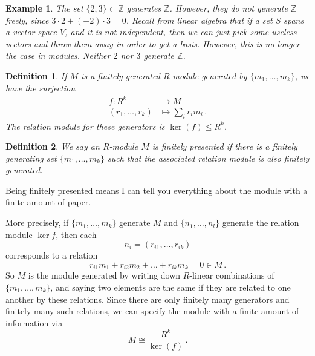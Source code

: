 \documentclass{article}
\theoremstyle{plain}\theoremheaderfont{\normalfont\itshape}\theorembodyfont{\rmfamily}\theoremseparator{.}\newtheorem*{rem}{Remark}\newtheorem*{ex}{Example}\newtheorem*{proof}{Proof}\newtheorem*{altp}{Alternative proof}\newtheorem*{nonex}{Non-Example}
\theoremstyle{plain}\theoremheaderfont{\normalfont\bfseries}\theorembodyfont{\rmfamily}\theoremseparator{.}\newtheorem{thm}{Theorem}[section]\newtheorem{lem}[thm]{Lemma}\newtheorem{prop}[thm]{Proposition}\newtheorem*{cor}{Corollary}\newtheorem{defn}[thm]{Definition}\newtheorem{clm}[thm]{Claim}\newtheorem{clminproof}{Claim}\newtheorem*{notn}{Notation}\newtheorem*{exer}{Exercise}\newtheorem*{lemnn}{Lemma}
\theoremstyle{break}\theoremheaderfont{\normalfont\itshape}\theorembodyfont{\rmfamily}\theoremseparator{.\medskip}\newtheorem*{proofskip}{Proof}\newtheorem*{exs}{Examples}\newtheorem*{rems}{Remarks}\newtheorem*{obs}{Observations}
\theoremstyle{break}\theoremheaderfont{\normalfont\bfseries}\theorembodyfont{\rmfamily}\theoremseparator{.\medskip}\newtheorem{lemskip}[thm]{Lemma}\newtheorem{defnskip}[thm]{Definition}\newtheorem{propskip}[thm]{Proposition}\newtheorem{thmskip}[thm]{Theorem}
\numberwithin{equation}{section}
\newcommand{\ZZ}{\mathbb{Z}}
\begin{document}
    \begin{ex}
        The set \(\{2,3\}\subset\ZZ\) generates \(\ZZ\). However, they do not generate \(\ZZ\) freely, since \(3\cdot 2+(-2)\cdot 3=0\). Recall from linear algebra that if a set \(S\) spans a vector space \(V\), and it is not independent, then we can just pick some useless vectors and throw them away in order to get a basis. However, this is no longer the case in modules. Neither \(2\) nor \(3\) generate \(\ZZ\).
    \end{ex}
    \begin{defn}
        If \(M\) is a finitely generated \(R\)-module generated by \(\{m_1,\dots,m_k\}\), we have the surjection
        \begin{align*}
            f:R^k&\longrightarrow M\\
            (r_1,\dots,r_k)&\longmapsto \sum_i r_im_i\,.
        \end{align*}
        The \textit{relation module} for these generators is \(\ker(f)\le R^k\).
    \end{defn}
    \begin{defn}
        We say an \(R\)-module \(M\) is \textit{finitely presented} if there is a finitely generating set \(\{m_1,\dots,m_k\}\) such that the associated relation module is also finitely generated.
    \end{defn}

    Being finitely presented means I can tell you everything about the module with a finite amount of paper.
    
    More precisely, if \(\{m_1,\dots,m_k\}\) generate \(M\) and \(\{n_1,\dots,n_l\}\) generate the relation module \(\ker f\), then each
    \[n_i=(r_{i1},\dots,r_{ik})\]
    corresponds to a relation
    \[r_{i1}m_1+r_{i2}m_2+\dots+r_{ik}m_k=0\in M\,.\]
    So \(M\) is the module generated by writing down \(R\)-linear combinations of \(\{m_1,\dots,m_k\}\), and saying two elements are the same if they are related to one another by these relations. Since there are only finitely many generators and finitely many such relations, we can specify the module with a finite amount of information via
    \[M\cong\frac{R^k}{\ker(f)}\,.\]
\end{document}
